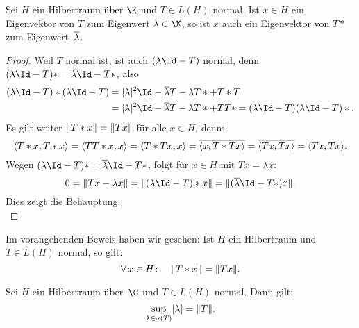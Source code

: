\begin{thLemma}
    Sei $H$ ein Hilbertraum über $\K$ und $T\in L(H)$ normal. Ist $x\in H$ ein
    Eigenvektor von $T$ zum Eigenwert $\lambda\in\K$, so ist $x$ auch ein
    Eigenvektor von $T*$ zum Eigenwert~$\overline\lambda$.
\end{thLemma}

\begin{proof}
    Weil $T$ normal ist, ist auch $(\lambda\Id-T)$ normal, denn
    $(\lambda\Id-T)* = \ol\lambda\Id-T*$, also
    \begin{align*}
        (\lambda\Id-T)* (\lambda\Id-T)
        &= \abs{\lambda}^2\Id-\ol\lambda T - \lambda T* + T*T 
        \\
        &= \abs{\lambda}^2\Id-\ol\lambda T - \lambda T* + TT*
         = (\lambda\Id-T) (\lambda\Id-T)* 
    . \end{align*}
    Es gilt weiter $\lVert T*x\rVert = \lVert Tx\rVert$ für alle $x\in H$, denn:
    \[ \SP{T*x,T*x} = \SP{TT*x,x} = \SP{T*Tx,x} 
        = \ol{\SP{x,T*Tx}} = \ol{\SP{Tx,Tx}}
        = \SP{Tx,Tx}
    . \]
    Wegen $(\lambda\Id-T)* = \ol\lambda\Id-T*$, folgt für $x\in H$ mit
    $Tx=\lambda x$:
    \[ 0 = \norm{Tx-\lambda x} = \norm{(\lambda\Id-T)*x} 
         = \norm{(\ol\lambda\Id-T*)x}
    . \]
    Dies zeigt die Behauptung.
    \\
\end{proof}

\nnBemerkung Im vorangehenden Beweis haben wir gesehen:
Ist $H$ ein Hilbertraum und $T\in L(H)$ normal, so gilt:
\[ \forall\,x\in H\colon\quad \lVert T*x\rVert = \lVert Tx\rVert  . \]

\begin{thLemma}
    Sei $H$ ein Hilbertraum über~$\C$ und $T\in L(H)$ normal. Dann gilt:
    \[ \sup_{\lambda\in\sigma(T)} \lvert\lambda\rvert  =  \lVert T\rVert  . \]
\end{thLemma}

